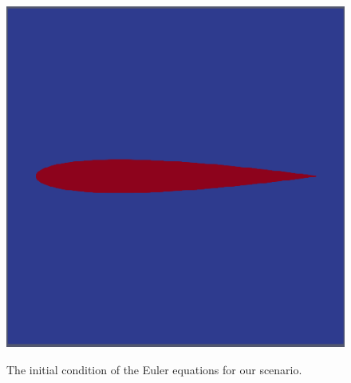 \documentclass[12pt,letterpaper]{article}
\begin{document}
\begin{figure}[!h]
\centering
\includegraphics[width=0.40\linewidth]{Euler_initial.png}\label{euler_initial}
\caption{The initial condition of the Euler equations for our scenario.}
\end{figure}
\end{document}

